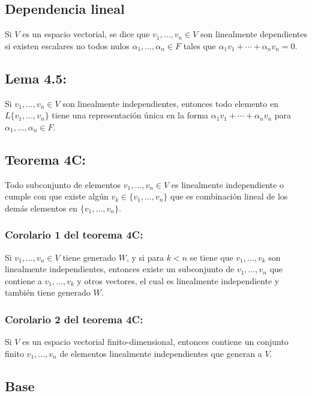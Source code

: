\documentclass{article}
\begin{document}
\subsection*{\color{violet} Dependencia lineal}

Si $V$ es un espacio vectorial, se dice que $v_1,\ldots,v_n\in V$ son linealmente dependientes si existen escalares no todos nulos $\alpha_1,\ldots,\alpha_n\in F$ tales que $\alpha_1v_1+\cdots+\alpha_nv_n=0$.

\subsection*{\color{blue} Lema 4.5:}

Si $v_1,\ldots,v_n\in V$ son linealmente independientes, entonces todo elemento en $L\{v_1,\ldots,v_n\}$ tiene una representación única en la forma $\alpha_1v_1+\cdots+\alpha_nv_n$ para $\alpha_1,\ldots,\alpha_n\in F$.

\subsection*{\color{red} Teorema 4C:}

Todo subconjunto de elementos $v_1,\ldots,v_n\in V$ es linealmente independiente o cumple con que existe algún $v_k\in\{v_1,\ldots,v_n\}$ que es combinación lineal de los demás elementos en $\{v_1,\ldots,v_n\}$.

\subsubsection*{\color{red} Corolario 1 del teorema 4C:}

Si $v_1,\ldots,v_n\in V$ tiene generado $W$, y si para $k<n$ se tiene que $v_1,\ldots,v_k$ son linealmente independientes, entonces existe un subconjunto de $v_1,\ldots,v_n$ que contiene a $v_1,\ldots,v_k$ y otros vectores, el cual es linealmente independiente y también tiene generado $W$.

\subsubsection*{\color{red} Corolario 2 del teorema 4C:}

Si $V$ es un espacio vectorial finito-dimensional, entonces contiene un conjunto finito $v_1,\ldots,v_n$ de elementos linealmente independientes que generan a $V$.

\subsection*{\color{violet} Base}
\end{document}
